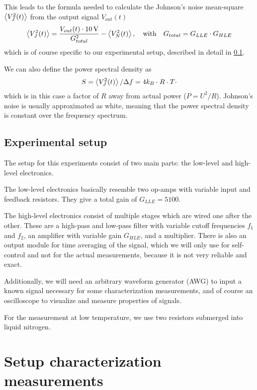 This leads to the formula needed to calculate the Johnson's noise mean-square $\expval{V_J^2(t)}$ from the output signal $V_{out}(t)$
\begin{equation}\label{eq:conversion}
	\expval{V_J^2(t)} = \frac{V_{out}(t) \cdot 10 \,\mathrm{V}}{G_{total}^2} - \expval{V_N^2(t)}, \quad \mathrm{with} \quad G_{total} = G_{LLE} \cdot G_{HLE}
\end{equation}
which is of course specific to our experimental setup, described in detail in \cref{sec:setup}.

We can also define the power spectral density as
\begin{equation}\label{eq:psd}
S = \expval{V_J^2(t)} / \Delta f = 4k_B \cdot R \cdot T \cdot
\end{equation}
which is in this case a factor of $R$ away from actual power ($P = U^2/R$). Johnson's noise is usually approximated as white, meaning that the power spectral density is constant over the frequency spectrum.

\subsection{Experimental setup} \label{sec:setup}

The setup for this experiments consist of two main parts: the low-level and high-level electronics. 

The low-level electronics basically resemble two op-amps with variable input and feedback resistors. They give a total gain of $G_{LLE} = 5100$.

The high-level electronics consist of multiple stages which are wired one after the other. These are a high-pass and low-pass filter with variable cutoff frequencies $f_1$ and $f_2$, an amplifier with variable gain $G_{HLE}$, and a multiplier. There is also an output module for time averaging of the signal, which we will only use for self-control and not for the actual measurements, because it is not very reliable and exact.

Additionally, we will need an arbitrary waveform generator (AWG) to input a known signal necessary for some characterization measurements, and of course an oscilloscope to visualize and measure properties of signals.

For the measurement at low temperature, we use two resistors submerged into liquid nitrogen.

\section{Setup characterization measurements}

